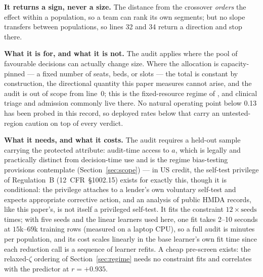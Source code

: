 \documentclass[9pt,conference]{IEEEtran}
\begin{document}
\textbf{It returns a sign, never a size.} The distance from the crossover \emph{orders} the
effect within a population, so a team can rank its own segments; but no slope transfers between
populations, so lines 32 and 34 return a direction and stop there.

\textbf{What it is for, and what it is not.} The audit applies where the pool of
favourable decisions can actually change size. Where the allocation is
capacity-pinned --- a fixed number of seats, beds, or slots --- the total is constant
by construction, the directional quantity this paper measures cannot arise, and the
audit is out of scope from line~0; this is the fixed-resource regime of
\cite{goethals2024}, and clinical triage and admission commonly live there. No
natural operating point below 0.13 has been probed in this record, so deployed rates
below that carry an untested-region caution on top of every verdict.

\textbf{What it needs, and what it costs.} The audit requires a held-out sample carrying
the protected attribute: audit-time access to $a$, which is legally and practically
distinct from decision-time use and is the regime bias-testing provisions contemplate
(Section~\ref{sec:scope}) --- in US credit, the self-test privilege of Regulation~B
(12~CFR~\S1002.15) exists for exactly this, though it is conditional: the privilege
attaches to a lender's own voluntary self-test and expects appropriate corrective
action, and an analysis of public HMDA records, like this paper's, is not itself a
privileged self-test. It fits the constraint $12 \times \mathrm{seeds}$ times; with five seeds
and the linear learners used here, one fit takes 2--10 seconds at $15$k--$69$k training
rows (measured on a laptop CPU), so a full audit is minutes per population, and its cost
scales linearly in the base learner's own fit time since each reduction call is a
sequence of learner refits. A cheap pre-screen exists: the relaxed-$\zeta$ ordering of
Section~\ref{sec:regime} needs no constraint fits and correlates with the predictor at
$r=+0.935$.
\end{document}
